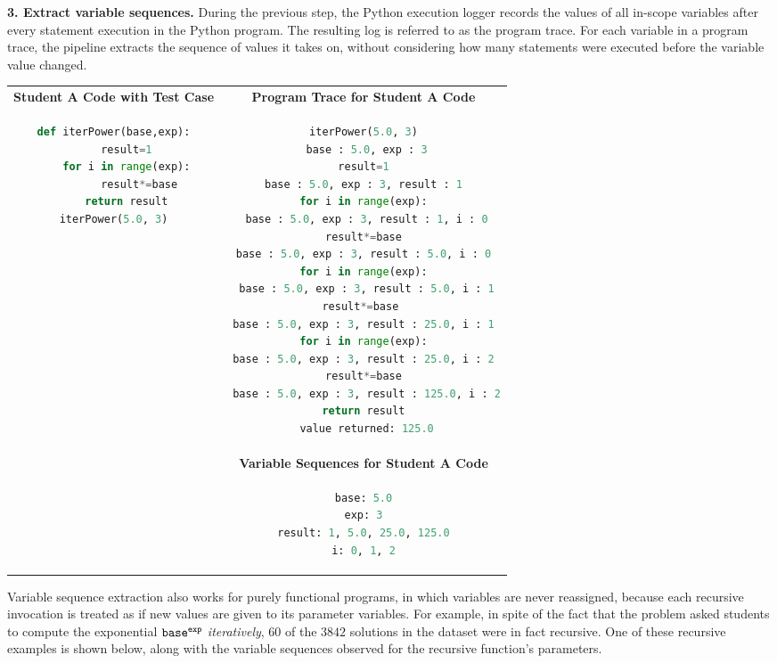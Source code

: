 {\bf 3. Extract variable sequences.} During the previous step, the Python execution logger \cite{pgbovineOPT} records the values of all in-scope variables after every statement execution in the Python program. The resulting log is referred to as the program trace. For each variable in a program trace, the pipeline extracts the sequence of values it takes on, without considering how many statements were executed before the variable value changed.
\\
\begin{tabular}{cc}
{\bf Student A Code with Test Case} & {\bf Program Trace for Student A Code} \\
\begin{minipage}{0.35\linewidth}
\begin{lstlisting}[language=python]
def iterPower(base,exp):
    result=1
    for i in range(exp):
        result*=base
    return result
iterPower(5.0, 3)
\end{lstlisting}
\end{minipage} &
\begin{minipage}{0.6\linewidth}
\begin{lstlisting}[language=python,linebackgroundcolor={\lstcolorlines[lightyellow]{2,4,6,8,10,12,14,16,18}}]
iterPower(5.0, 3)
 base : 5.0, exp : 3
result=1
 base : 5.0, exp : 3, result : 1 
for i in range(exp):
 base : 5.0, exp : 3, result : 1, i : 0
result*=base
 base : 5.0, exp : 3, result : 5.0, i : 0 
for i in range(exp):
 base : 5.0, exp : 3, result : 5.0, i : 1
result*=base 
 base : 5.0, exp : 3, result : 25.0, i : 1 
for i in range(exp):
 base : 5.0, exp : 3, result : 25.0, i : 2 
result*=base
 base : 5.0, exp : 3, result : 125.0, i : 2
return result
 value returned: 125.0
\end{lstlisting}
\end{minipage} 
\\
& {\bf Variable Sequences for Student A Code} \\
&
\begin{minipage}{0.6\linewidth}
\begin{lstlisting}[language=python]
base: 5.0
exp: 3
result: 1, 5.0, 25.0, 125.0
i: 0, 1, 2
\end{lstlisting}
\end{minipage} \\
\end{tabular}

Variable sequence extraction also works for purely functional programs, in which variables are never reassigned, because each recursive invocation is treated as if new values are given to its parameter variables. For example, in spite of the fact that the  problem asked students to compute the exponential $\texttt{base}^{\texttt{exp}}$ \textit{iteratively}, $60$ of the $3842$  solutions in the dataset were in fact recursive. One of these recursive examples is shown below, along with the variable sequences observed for the recursive function's parameters.

